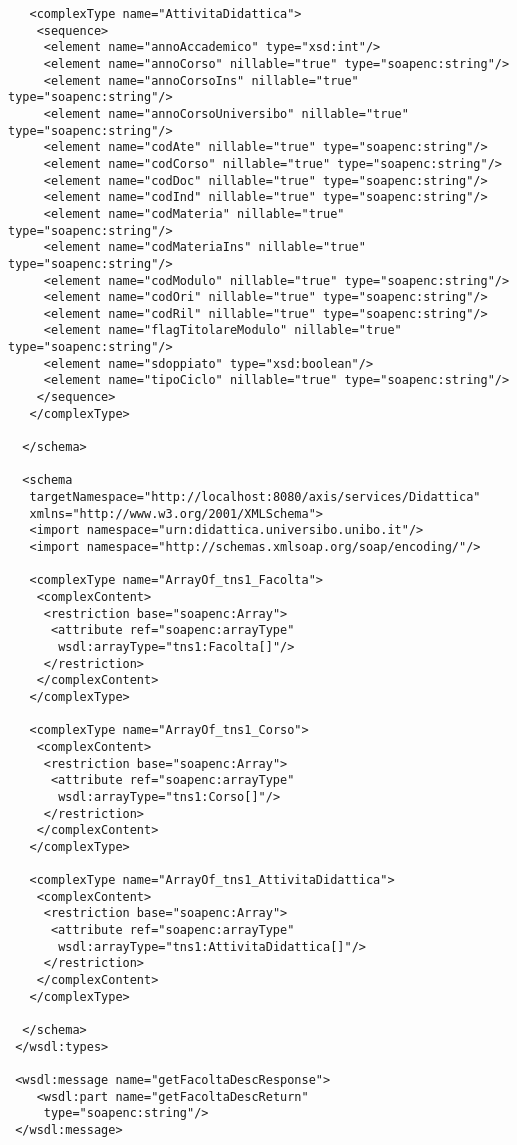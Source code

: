 \begin{small}
\begin{verbatim}
   <complexType name="AttivitaDidattica">
    <sequence>
     <element name="annoAccademico" type="xsd:int"/>
     <element name="annoCorso" nillable="true" type="soapenc:string"/>
     <element name="annoCorsoIns" nillable="true" type="soapenc:string"/>
     <element name="annoCorsoUniversibo" nillable="true" type="soapenc:string"/>
     <element name="codAte" nillable="true" type="soapenc:string"/>
     <element name="codCorso" nillable="true" type="soapenc:string"/>
     <element name="codDoc" nillable="true" type="soapenc:string"/>
     <element name="codInd" nillable="true" type="soapenc:string"/>
     <element name="codMateria" nillable="true" type="soapenc:string"/>
     <element name="codMateriaIns" nillable="true" type="soapenc:string"/>
     <element name="codModulo" nillable="true" type="soapenc:string"/>
     <element name="codOri" nillable="true" type="soapenc:string"/>
     <element name="codRil" nillable="true" type="soapenc:string"/>
     <element name="flagTitolareModulo" nillable="true" type="soapenc:string"/>
     <element name="sdoppiato" type="xsd:boolean"/>
     <element name="tipoCiclo" nillable="true" type="soapenc:string"/>
    </sequence>
   </complexType>

  </schema>
  
  <schema
   targetNamespace="http://localhost:8080/axis/services/Didattica"
   xmlns="http://www.w3.org/2001/XMLSchema">
   <import namespace="urn:didattica.universibo.unibo.it"/>
   <import namespace="http://schemas.xmlsoap.org/soap/encoding/"/>
   
   <complexType name="ArrayOf_tns1_Facolta">
    <complexContent>
     <restriction base="soapenc:Array">
      <attribute ref="soapenc:arrayType"
       wsdl:arrayType="tns1:Facolta[]"/>
     </restriction>
    </complexContent>
   </complexType>
   
   <complexType name="ArrayOf_tns1_Corso">
    <complexContent>
     <restriction base="soapenc:Array">
      <attribute ref="soapenc:arrayType"
       wsdl:arrayType="tns1:Corso[]"/>
     </restriction>
    </complexContent>
   </complexType>

   <complexType name="ArrayOf_tns1_AttivitaDidattica">
    <complexContent>
     <restriction base="soapenc:Array">
      <attribute ref="soapenc:arrayType"
       wsdl:arrayType="tns1:AttivitaDidattica[]"/>
     </restriction>
    </complexContent>
   </complexType>
  
  </schema>
 </wsdl:types>

 <wsdl:message name="getFacoltaDescResponse">
    <wsdl:part name="getFacoltaDescReturn"
     type="soapenc:string"/>
 </wsdl:message>


\end{verbatim}
\end{small}

